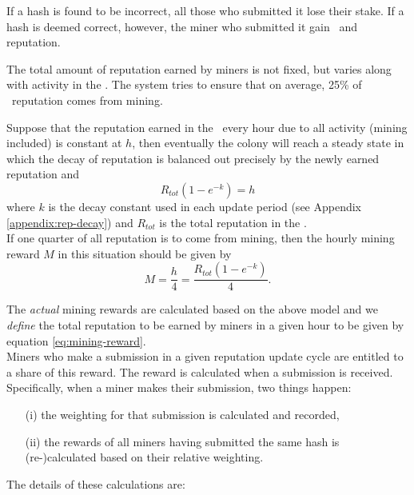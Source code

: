 If a hash is found to be incorrect, all those who submitted it lose their stake. If a hash is deemed correct, however, the miner who submitted it gain \rcts\ and reputation. 

The total amount of reputation earned by miners is not fixed, but varies along with activity in the \rc. The system tries to ensure that on average, 25\% of \rc\ reputation comes from mining. %

Suppose that the reputation earned in the \rc\ every hour due to all activity (mining included) is constant at $h$, then eventually the colony will reach a steady state in which the decay of reputation is balanced out precisely by the newly earned reputation and
\begin{equation}
 R_{tot} \left( 1 - e^{-k} \right) = h
\end{equation}
\noindent where $k$ is the decay constant used in each update period (see Appendix \ref{appendix:rep-decay}) and $R_{tot}$ is the total reputation in the \rc.\\
If one quarter of all reputation is to come from mining, then the hourly mining reward $M$ in this situation should be given by
\begin{equation}\label{eq:mining-reward}
 M = \frac{h}{4} = \frac{R_{tot} \left( 1 - e^{-k} \right)}{4}.
\end{equation}

The \emph{actual} mining rewards are calculated based on the above model and we \emph{define} the total reputation to be earned by miners in a given hour to be given by equation \eqref{eq:mining-reward}.\\

Miners who make a submission in a given reputation update cycle are entitled to a share of this reward. The reward is calculated when a submission is received. Specifically, when a miner makes their submission, two things happen:
\begin{itemize}
 \item[(i)] the weighting for that submission is calculated and recorded,
 \item[(ii)] the rewards of all miners having submitted the same hash is (re-)calculated based on their relative weighting.
\end{itemize}
\noindent The details of these calculations are:\\

